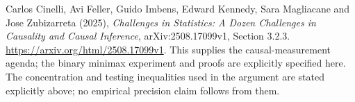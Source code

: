 \documentclass[11pt,a4paper]{article}
\theoremstyle{definition}
\theoremstyle{remark}
\begin{document}
Carlos Cinelli, Avi Feller, Guido Imbens, Edward Kennedy, Sara Magliacane and Jose Zubizarreta (2025), \emph{Challenges in Statistics: A Dozen Challenges in Causality and Causal Inference}, arXiv:2508.17099v1, Section 3.2.3. \url{https://arxiv.org/html/2508.17099v1}. This supplies the causal-measurement agenda; the binary minimax experiment and proofs are explicitly specified here. The concentration and testing inequalities used in the argument are stated explicitly above; no empirical precision claim follows from them.
\end{document}
